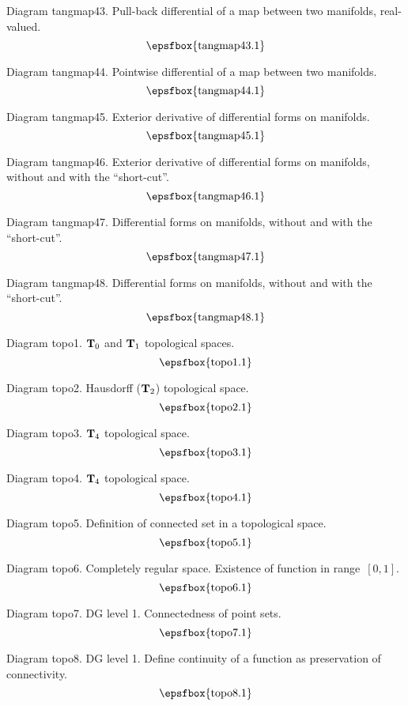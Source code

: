 \filleject

Diagram tangmap43. Pull-back differential of a map between two manifolds,
real-valued.
$$
\centerline{\epsfbox{tangmap43.1}}
$$

Diagram tangmap44. Pointwise differential of a map between two manifolds.
$$
\centerline{\epsfbox{tangmap44.1}}
$$

Diagram tangmap45. Exterior derivative of differential forms on manifolds.
$$
\centerline{\epsfbox{tangmap45.1}}
$$

Diagram tangmap46. Exterior derivative of differential forms on manifolds,
without and with the ``short-cut''.
$$
\centerline{\epsfbox{tangmap46.1}}
$$

\filleject

Diagram tangmap47. Differential forms on manifolds, without and with the
``short-cut''.
$$
\centerline{\epsfbox{tangmap47.1}}
$$

Diagram tangmap48. Differential forms on manifolds, without and with the
``short-cut''.
$$
\centerline{\epsfbox{tangmap48.1}}
$$

\secteject
\edef\SECTtopo{\the\pageno}

Diagram topo1. ${\bf T}_0$ and ${\bf T}_1$ topological spaces.
$$
\centerline{\epsfbox{topo1.1}}
$$

Diagram topo2. Hausdorff (${\bf T}_2$) topological space.
$$
\centerline{\epsfbox{topo2.1}}
$$

Diagram topo3. ${\bf T}_4$ topological space.
$$
\centerline{\epsfbox{topo3.1}}
$$

Diagram topo4. ${\bf T}_4$ topological space.
$$
\centerline{\epsfbox{topo4.1}}
$$

Diagram topo5. Definition of connected set in a topological space.
$$
\centerline{\epsfbox{topo5.1}}
$$

Diagram topo6. Completely regular space. Existence of function in range~$[0,1]$.
$$
\centerline{\epsfbox{topo6.1}}
$$

\filleject

Diagram topo7. DG level 1. Connectedness of point sets.
$$
\centerline{\epsfbox{topo7.1}}
$$

Diagram topo8. DG level 1. Define continuity of a function as preservation of
connectivity.
$$
\centerline{\epsfbox{topo8.1}}
$$

